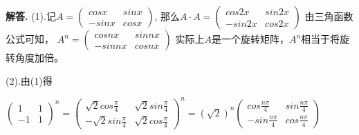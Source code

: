 \documentclass[12pt, a4paper, oneside]{ctexart}
\newenvironment{solution}{\par\noindent\textbf{解答. }}{\par}
\begin{document}
\begin{solution}
(1).记$A=
\begin{pmatrix}
    cosx & sinx \\
    -sinx & cosx
\end{pmatrix}$,
那么$A \cdot A=
\begin{pmatrix}
    cos2x & sin2x \\
    -sin2x & cos2x
\end{pmatrix}$
由三角函数公式可知，
$A^n=
\begin{pmatrix}
    cosnx & sinnx \\
    -sinnx & cosnx
\end{pmatrix}$
实际上$A$是一个旋转矩阵，$A^n$相当于将旋转角度加倍。

(2).由(1)得

$
\begin{pmatrix}
    1 & 1 \\
    -1 & 1
\end{pmatrix}^n
=
\begin{pmatrix}
    \sqrt{2}cos\frac{\pi}{4} & \sqrt{2}sin\frac{\pi}{4} \\
    -\sqrt{2}sin\frac{\pi}{4} & \sqrt{2}cos\frac{\pi}{4}
\end{pmatrix}^n
=(\sqrt{2})^n
\begin{pmatrix}
    cos\frac{n\pi}{4} & sin\frac{n\pi}{4} \\
    -sin\frac{n\pi}{4} & cos\frac{n\pi}{4}
\end{pmatrix}
$


\end{solution}
\end{document}
